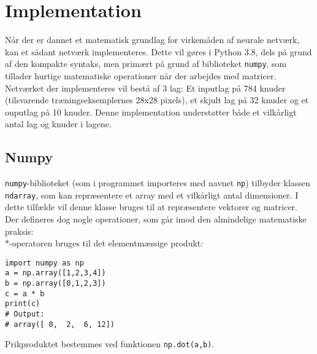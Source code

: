 \documentclass[../SOP.tex]{subfile}
\begin{document}
\section{Implementation}
Når der er dannet et matematisk grundlag for virkemåden af neurale netværk, kan et sådant netværk implementeres. Dette vil gøres i Python 3.8, dels på grund af den kompakte syntaks, men primært på grund af biblioteket \texttt{numpy}, som tillader hurtige matematiske operationer når der arbejdes med matricer. Netværket der implementeres vil bestå af 3 lag: Et inputlag på 784 knuder (tilsvarende træningseksemplernes 28x28 pixels), et skjult lag på 32 knuder og et ouputlag på 10 knuder. Denne implementation understøtter både et vilkårligt antal lag og knuder i lagene. 
\subsection{Numpy}
\texttt{numpy}-biblioteket (som i programmet importeres med navnet \texttt{np}) tilbyder klassen \texttt{ndarray}, som kan repræsentere et array med et vilkårligt antal dimensioner. I dette tilfælde vil denne klasse bruges til at repræsentere vektorer og matricer. Der defineres dog nogle operationer, som går imod den almindelige matematiske praksis:\\
*-operatoren bruges til det elementmæssige produkt:
\begin{verbatim}
import numpy as np
a = np.array([1,2,3,4])
b = np.array([0,1,2,3])
c = a * b
print(c)
# Output:
# array([ 0,  2,  6, 12])
\end{verbatim}
Prikproduktet bestemmes ved funktionen \texttt{np.dot(a,b)}.\\
\end{document}
